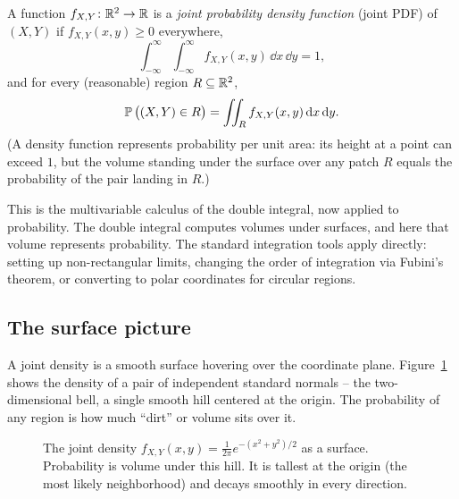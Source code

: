 \begin{definition}
\label{ch13:def-joint-pdf}
A function $f_{X,Y}\colon \mathbb{R}^2 \to \mathbb{R}$ is a \emph{joint probability density
function} (joint PDF) of $(X,Y)$ if $f_{X,Y}(x,y)\ge 0$ everywhere,
\[
  \int_{-\infty}^{\infty}\!\!\int_{-\infty}^{\infty} f_{X,Y}(x,y)\,\dd x\,\dd y = 1,
\]
and for every (reasonable) region $R \subseteq \mathbb{R}^2$,
\[
  \operatorname{\mathbb{P}}\big((X,Y)\in R\big) = \iint_{R} f_{X,Y}(x,y)\,\mathrm{d} x\,\mathrm{d} y .
\]
(A density function represents probability per unit area: its height at a point
can exceed $1$, but the volume standing under the surface over any patch $R$
equals the probability of the pair landing in $R$.)
\end{definition}

\begin{connectionbox}
This is the multivariable calculus of the double integral, now applied to probability.
The double integral computes volumes under surfaces, and here that volume represents
probability. The standard integration tools apply directly: setting up non-rectangular
limits, changing the order of integration via Fubini's theorem, or converting to polar
coordinates for circular regions.
\end{connectionbox}

\subsection{The surface picture}

A joint density is a smooth surface hovering over the coordinate plane.
Figure~\ref{ch13:fig-surface} shows the density of a pair of independent standard
normals -- the two-dimensional bell, a single smooth hill centered at the origin.
The probability of any region is how much ``dirt'' or volume sits over it.

\begin{figure}[H]
\centering
{}
\caption{The joint density $f_{X,Y}(x,y)=\frac{1}{2\pi}e^{-(x^2+y^2)/2}$ as a
surface. Probability is volume under this hill. It is tallest at the origin
(the most likely neighborhood) and decays smoothly in every direction.}
\label{ch13:fig-surface}
\end{figure}

